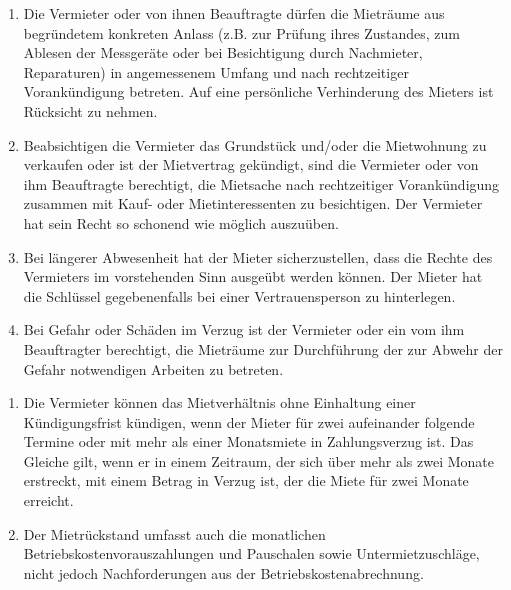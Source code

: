 \documentclass{scrreprt}[12pt,a4paper,twoside,duplex]
\begin{document}
\begin{contract}
	\begin{enumerate}
		\item Die Vermieter oder von ihnen Beauftragte dürfen die Mieträume aus begründetem konkreten Anlass (z.B. zur Prüfung  ihres Zustandes, zum Ablesen der Messgeräte oder bei Besichtigung durch Nachmieter, Reparaturen) in angemessenem Umfang und nach rechtzeitiger Vorankündigung betreten. Auf eine persönliche Verhinderung des Mieters ist Rücksicht zu nehmen.
		\item Beabsichtigen die Vermieter das Grundstück und/oder die Mietwohnung zu verkaufen oder ist der Mietvertrag gekündigt, sind die  Vermieter oder von ihm Beauftragte berechtigt, die Mietsache nach rechtzeitiger Vorankündigung zusammen mit Kauf- oder Mietinteressenten zu besichtigen. Der Vermieter hat sein Recht so schonend wie möglich auszuüben.
		\item Bei längerer Abwesenheit hat der Mieter sicherzustellen, dass die Rechte des Vermieters im vorstehenden Sinn ausgeübt werden können. Der Mieter hat die Schlüssel gegebenenfalls bei einer Vertrauensperson zu hinterlegen.
		\item Bei Gefahr oder Schäden im Verzug ist der Vermieter oder ein vom ihm Beauftragter berechtigt, die Mieträume zur Durchführung der zur Abwehr der Gefahr notwendigen Arbeiten zu betreten.
	\end{enumerate}
\end{contract}

\begin{contract}
	
	\begin{enumerate}
	\item Die Vermieter können das Mietverhältnis ohne Einhaltung einer Kündigungsfrist kündigen, wenn der Mieter für zwei aufeinander folgende Termine oder mit mehr als einer Monatsmiete in Zahlungsverzug ist. Das Gleiche gilt, wenn er in einem Zeitraum, der sich über mehr als zwei Monate erstreckt, mit einem Betrag in Verzug ist, der die Miete für zwei Monate erreicht.
	
	\item Der Mietrückstand umfasst auch die monatlichen Betriebskostenvorauszahlungen und Pauschalen sowie Untermietzuschläge, nicht jedoch Nachforderungen aus der Betriebskostenabrechnung.
	\end{enumerate}
\end{contract}
\end{document}
